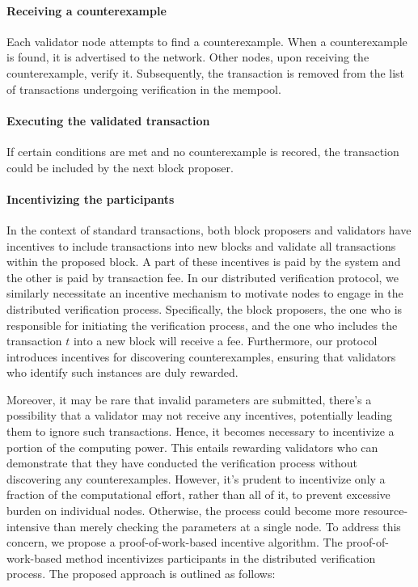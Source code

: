 \documentclass[runningheads]{llncs}
\begin{document}
\paragraph{Receiving a counterexample} Each validator node attempts to find a counterexample. When a counterexample is found, it is advertised to the network. Other nodes, upon receiving the counterexample, verify it. Subsequently, the transaction is removed from the list of transactions undergoing verification in the mempool. 
\paragraph{Executing the validated transaction} If certain conditions are met and no counterexample is recored, the transaction could be included by the next block proposer.
\paragraph{Incentivizing the participants}  In the context of standard transactions, both block proposers and validators have incentives to include transactions into new blocks and validate all transactions within the proposed block. A part of these incentives is paid by the system and the other is paid by transaction fee. In our distributed verification protocol, we similarly necessitate an incentive mechanism to motivate nodes to engage in the distributed verification process. Specifically, the block proposers, the one who is responsible for initiating the verification process, and the one who includes the transaction $t$ into a new block will receive a fee. Furthermore, our protocol introduces incentives for discovering counterexamples, ensuring that validators who identify such instances are duly rewarded.

Moreover, it may be rare that invalid parameters are submitted, there's a possibility that a validator may not receive any incentives, potentially leading them to ignore such transactions. Hence, it becomes necessary to incentivize a portion of the computing power. This entails rewarding validators who can demonstrate that they have conducted the verification process without discovering any counterexamples. However, it's prudent to incentivize only a fraction of the computational effort, rather than all of it, to prevent excessive burden on individual nodes. Otherwise, the process could become more resource-intensive than merely checking the parameters at a single node. To address this concern, we propose a proof-of-work-based incentive algorithm. The proof-of-work-based method incentivizes participants in the distributed verification process. The proposed approach is outlined as follows:
\end{document}
